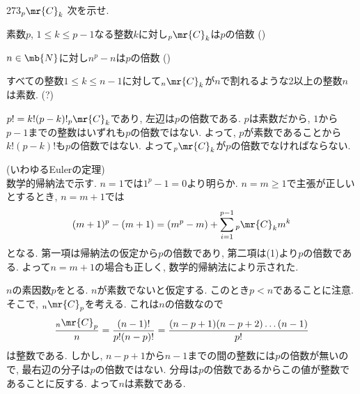 \begin{thm}{273}{}{${}_{p}\mr{C}_{k}$}
次を示せ. 
\ben 
\item 素数$p$, $1\leq k\leq p-1$なる整数$k$に対し${}_{p}\mr{C}_{k}$は$p$の倍数 () 
\item $n\in\mb{N}$に対し$n^{p} - n$は$p$の倍数 ()
\item すべての整数$1\leq k\leq n-1$に対して${}_{n}\mr{C}_{k}$が$n$で割れるような2以上の整数$n$は素数. (\hosi ?)
\een 

\end{thm} 
$p! = k! (p-k)! {}_{p}\mr{C}_{k}$であり, 左辺は$p$の倍数である. $p$は素数だから, $1$から$p-1$までの整数はいずれも$p$の倍数ではない. よって, $p$が素数であることから$k! (p-k)!$も$p$の倍数ではない. よって${}_{p}\mr{C}_{k}$が$p$の倍数でなければならない. 

 (いわゆるEulerの定理) \\
数学的帰納法で示す. $n=1$では$1^p - 1 = 0$より明らか. $n=m\geq 1$で主張が正しいとするとき, $n=m+1$では
\[
(m+1)^{p} - (m+1) = (m^{p} - m) + \sum_{i=1}^{p-1} {}_{p}\mr{C}_{k} m^{k}
\]
となる. 第一項は帰納法の仮定から$p$の倍数であり, 第二項は(1)より$p$の倍数である. よって$n=m+1$の場合も正しく, 数学的帰納法により示された. 

  $n$の素因数$p$をとる. $n$が素数でないと仮定する. このとき$p<n$であることに注意. そこで, ${}_{n}\mr{C}_{p}$を考える. これは$n$の倍数なので
\[
\dfrac{{}_{n}\mr{C}_{p}}{n} = \dfrac{(n-1)!}{p!(n-p)!} = \dfrac{(n-p+1)(n-p+2) \dots (n-1)}{p!}
\]
は整数である. しかし, $n-p+1$から$n-1$までの間の整数には$p$の倍数が無いので, 最右辺の分子は$p$の倍数ではない. 分母は$p$の倍数であるからこの値が整数であることに反する. よって$n$は素数である. 